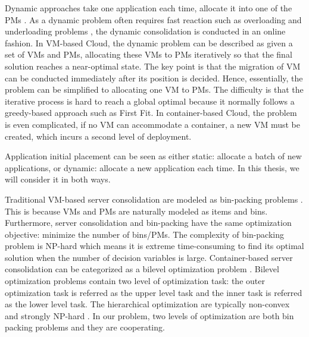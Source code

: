 Dynamic approaches take one application each time, allocate it into one of the PMs \cite{Xiao:2015ik}. As a dynamic problem often requires fast reaction such as overloading and underloading problems \cite{Beloglazov:2013ht},
the dynamic consolidation is conducted in an online fashion. In VM-based Cloud, the dynamic problem can be described as given a set of VMs and PMs, allocating these VMs to PMs iteratively so that the final solution reaches a near-optimal state.
The key point is that the migration of VM can be conducted immediately after its position is decided. Hence, essentially, the problem can be simplified to allocating one VM to PMs. The difficulty is that the iterative process is hard to reach a global optimal because it normally follows a greedy-based approach such as First Fit. In container-based Cloud,  the problem is even complicated, if no VM can accommodate a container, a new VM must be created, which incurs a second level of deployment.

Application initial placement can be seen as either static: allocate a batch of new applications, or dynamic: allocate a new application each time. In this thesis, we will consider it in both ways.

Traditional VM-based server consolidation are modeled as bin-packing problems \cite{Mann:2015ua}. This is because VMs and PMs are naturally modeled as items and bins. Furthermore, server consolidation and bin-packing have the same optimization objective: minimize the number of bins/PMs. The complexity of bin-packing problem is NP-hard which means it is extreme time-consuming to find its optimal solution when the number of decision variables is large. Container-based server consolidation can be categorized as a bilevel optimization problem \cite{Colson:2007bu}. Bilevel optimization problems contain two level of optimization task: the outer optimization task is referred as the upper level task and the inner task is referred as the lower level task. The hierarchical optimization are typically non-convex and strongly NP-hard \cite{Vicente:1994ie}. In our problem, two levels of optimization are both bin packing problems and they are cooperating.

